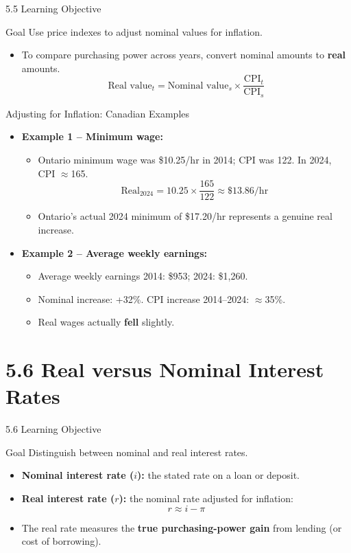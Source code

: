 \documentclass[aspectratio=169]{beamer}
\begin{document}
\begin{frame}{5.5 Learning Objective}
\transfade
\begin{block}{Goal}
Use price indexes to adjust nominal values for inflation.
\end{block}
\begin{itemize}[<+->]
  \item To compare purchasing power across years, convert nominal amounts to \textbf{real} amounts.
  \[
    \text{Real value}_t = \text{Nominal value}_s \times \frac{\text{CPI}_t}{\text{CPI}_s}
  \]
\end{itemize}
\end{frame}

\begin{frame}{Adjusting for Inflation: Canadian Examples}
\transfade
\begin{itemize}[<+->]
  \item \textbf{Example 1 -- Minimum wage:}
  \begin{itemize}[<+->]
    \item Ontario minimum wage was \$10.25/hr in 2014; CPI was 122. In 2024, CPI $\approx$165.
    \[
      \text{Real}_{2024} = 10.25 \times \frac{165}{122} \approx \$13.86/\text{hr}
    \]
    \item Ontario's actual 2024 minimum of \$17.20/hr represents a genuine real increase.
  \end{itemize}
  \item \textbf{Example 2 -- Average weekly earnings:}
  \begin{itemize}[<+->]
    \item Average weekly earnings 2014: \$953; 2024: \$1,260.
    \item Nominal increase: +32\%. CPI increase 2014--2024: $\approx$35\%.
    \item Real wages actually \textbf{fell} slightly.
  \end{itemize}
\end{itemize}
\end{frame}

\section{5.6 Real versus Nominal Interest Rates}

\begin{frame}{5.6 Learning Objective}
\transfade
\begin{block}{Goal}
Distinguish between nominal and real interest rates.
\end{block}
\begin{itemize}[<+->]
  \item \textbf{Nominal interest rate ($i$):} the stated rate on a loan or deposit.
  \item \textbf{Real interest rate ($r$):} the nominal rate adjusted for inflation:
  \[
    r \approx i - \pi
  \]
  \item The real rate measures the \textbf{true purchasing-power gain} from lending (or cost of borrowing).
\end{itemize}
\end{frame}
\end{document}
